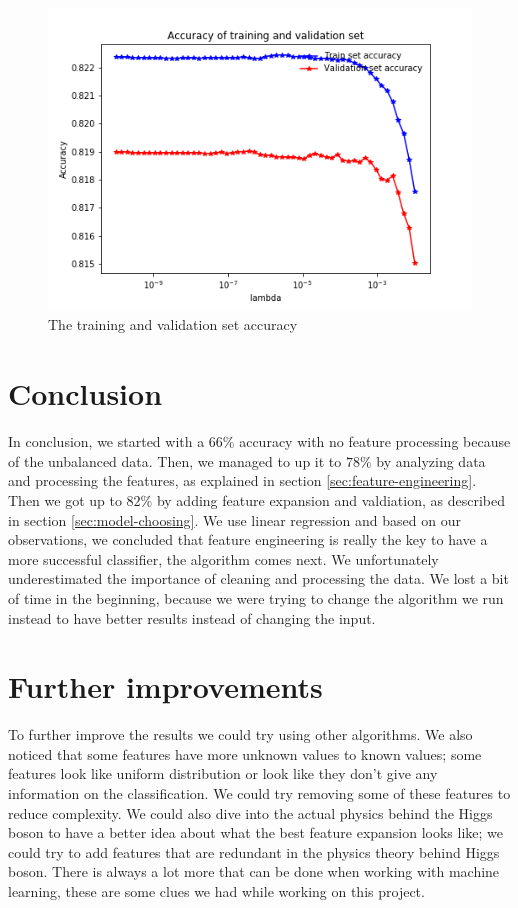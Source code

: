 \documentclass[10pt,conference,compsocconf]{IEEEtran}
\begin{document}
\begin{figure}[h!]
	\centering
  \includegraphics[width=\columnwidth]{validation.png}
  \caption{The training and validation set accuracy}
	\label{fig:training-and-validation-set-accuracy}
\end{figure}
\section{Conclusion}
In conclusion, we started with a $66\%$ accuracy with no feature processing because of the unbalanced data. Then, we managed to up it to $78\%$ by analyzing data and processing the features, as explained in section \ref{sec:feature-engineering}. Then we got up to $82\%$ by adding feature expansion and valdiation, as described in section \ref{sec:model-choosing}. We use linear regression and based on our observations, we concluded that feature engineering is really the key to have a more successful classifier, the algorithm comes next. We unfortunately underestimated the importance of cleaning and processing the data. We lost a bit of time in the beginning, because we were trying to change the algorithm we run instead to have better results instead of changing the input.

\section{Further improvements}
To further improve the results we could try using other algorithms. We also noticed that some features have more unknown values to known values; some features look like uniform distribution or look like they don't give any information on the classification. We could try removing some of these features to reduce complexity. We could also dive into the actual physics behind the Higgs boson to have a better idea about what the best feature expansion looks like; we could try to add features that are redundant in the physics theory behind Higgs boson. There is always a lot more that can be done when working with machine learning, these are some clues we had while working on this project.
\end{document}
